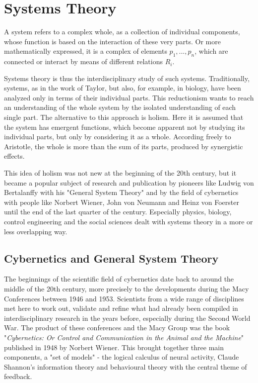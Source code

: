 \documentclass[a4paper,12pt]{scrartcl}
\begin{document}
\clearpage

\section{Systems Theory}

A system refers to a complex whole, as a collection of individual components, whose function is based on the interaction of these very parts. Or more mathematically expressed, it is a complex of elements $ p_{1},...,p_{n} $, which are connected or interact by means of different relations $ R_{i} $.\cite{bertalanffy:1950}

Systems theory is thus the interdisciplinary study of such systems.
Traditionally, systems, as in the work of Taylor, but also, for example, in biology, have been analyzed only in terms of their individual parts. This reductionism wants to reach an understanding of the whole system by the isolated understanding of each single part. 
The alternative to this approach is holism. Here it is assumed that the system has emergent functions, which become apparent not by studying its individual parts, but only by considering it as a whole. According freely to Aristotle, the whole is more than the sum of its parts, produced by synergistic effects.

This idea of holism was not new at the beginning of the 20th century, but it became a popular subject of research and publication by pioneers like Ludwig von Bertalanffy with his "General System Theory" and by the field of cybernetics with people like Norbert Wiener, John von Neumann and Heinz von Foerster until the end of the last quarter of the century.
Especially physics, biology, control engineering and the social sciences dealt with systems theory in a more or less overlapping way.\cite{jackson:2003}

\subsection{Cybernetics and General System Theory}	
The beginnings of the scientific field of cybernetics date back to around the middle of the 20th century, more precisely to the developments during the Macy Conferences between 1946 and 1953. Scientists from a wide range of disciplines met here to work out, validate and refine what had already been compiled in interdisciplinary research in the years before, especially during the Second World War. The product of these conferences and the Macy Group was the book "\textit{Cybernetics: Or Control and Communication in the Animal and the Machine}" published in 1948 by Norbert Wiener. This brought together three main components, a "set of models" - the logical calculus of neural activity, Claude Shannon's information theory and behavioural theory with the central theme of feedback.\cite{pias:2004}
\end{document}
